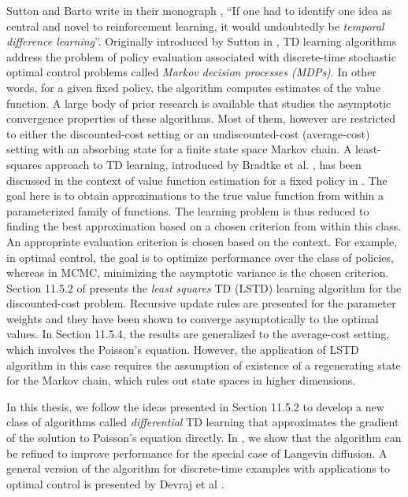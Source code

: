 Sutton and Barto write in their monograph \cite{sutbar98}, ``If one had to identify one idea as central and novel to reinforcement learning, it would undoubtedly be \textit{temporal difference learning}''. Originally introduced by Sutton in \cite{sut88}, TD learning algorithms address the problem of policy evaluation associated with discrete-time stochastic optimal control problems called \textit{Markov decision processes (MDPs)}. In other words, for a given fixed policy, the algorithm computes estimates of the value function. A large body of prior research is available that studies the asymptotic convergence properties of these algorithms. Most of them, however are restricted to either the discounted-cost setting or an undiscounted-cost (average-cost) setting with an absorbing state for a finite state space Markov chain. A least-squares approach to TD learning, introduced by Bradtke et al. \cite{brabar96},  has been discussed in the context of value function estimation for a fixed policy in \cite{ctcn}. The goal here is to obtain approximations to the true value function from within a parameterized family of functions. The learning problem is thus reduced to finding the best approximation based on a chosen criterion from within this class. An appropriate evaluation criterion is chosen based on the context. For example, in optimal control, the goal is to optimize performance over the class of policies, whereas in MCMC, minimizing the asymptotic variance is the chosen criterion. Section 11.5.2 of \cite{ctcn} presents the \textit{least squares} TD (LSTD) learning algorithm for the discounted-cost problem. Recursive update rules are presented for the parameter weights and they have been shown to converge asymptotically to the optimal values. In Section 11.5.4, the results are generalized to the average-cost setting, which involves the Poisson's equation. However, the application of LSTD algorithm in this case requires the assumption of existence of a regenerating state for the Markov chain, which rules out state spaces in higher dimensions.

In this thesis, we follow the ideas presented in Section 11.5.2 to develop a new class of algorithms called \textit{differential} TD learning that approximates the gradient of the solution to Poisson's equation directly. In , we show that the algorithm can be refined to improve performance for the special case of Langevin diffusion.  %
A general version of the algorithm for discrete-time examples with applications to optimal control is presented by Devraj et al \cite{devmey16arXiv}.
 

